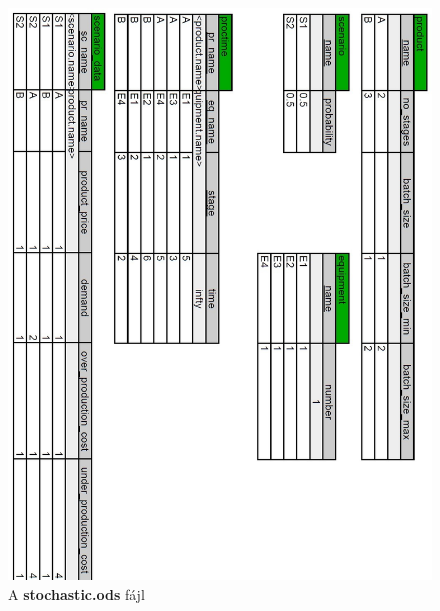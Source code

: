 \begin{figure}[H]
\begin{center}
\includegraphics[scale=0.5]{stochasticOds}
\caption{A \textbf{stochastic.ods} fájl}
\label{stochastic_ods}
\end{center}
\end{figure}
